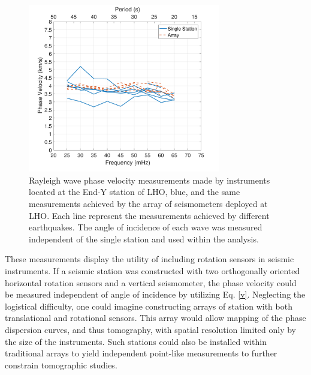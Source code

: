 \documentclass [12pt, proquest]{uwthesis}[2019]
\begin{document}
\begin{figure}%
\begin{center}
\includegraphics[width=0.75\textwidth]{Vel.pdf}
\caption[Single station Rayleigh wave phase velocity measurements]{Rayleigh wave phase velocity measurements made by instruments located at the End-Y station of LHO, blue, and the same measurements achieved by the array of seismometers deployed at LHO. Each line represent the measurements achieved by different earthquakes. The angle of incidence of each wave was measured independent of the single station and used within the analysis.~\cite{tiltSeismology}}
\label{Phase_Hanford}
\end{center}
\end{figure}

These measurements display the utility of including rotation sensors in seismic instruments. If a seismic station was constructed with two orthogonally oriented horizontal rotation sensors and a vertical seismometer, the phase velocity could be measured independent of angle of incidence by utilizing Eq. \ref{v}. Neglecting the logistical difficulty, one could imagine constructing arrays of station with both translational and rotational sensors. This array would allow mapping of the phase dispersion curves, and thus tomography, with spatial resolution limited only by the size of the instruments. Such stations could also be installed within traditional arrays to yield independent point-like measurements to further constrain tomographic studies.

%
\end{document}
